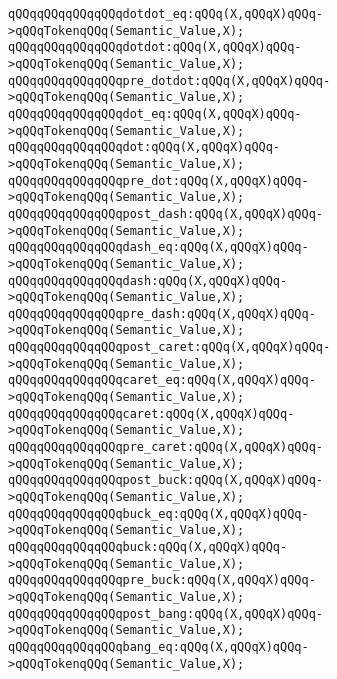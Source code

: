 \verb|qQQqqQQqqQQqqQQqdotdot_eq:qQQq(X,qQQqX)qQQq->qQQqTokenqQQq(Semantic_Value,X);|\newline
\verb|qQQqqQQqqQQqqQQqdotdot:qQQq(X,qQQqX)qQQq->qQQqTokenqQQq(Semantic_Value,X);|\newline
\verb|qQQqqQQqqQQqqQQqpre_dotdot:qQQq(X,qQQqX)qQQq->qQQqTokenqQQq(Semantic_Value,X);|\newline
\verb|qQQqqQQqqQQqqQQqdot_eq:qQQq(X,qQQqX)qQQq->qQQqTokenqQQq(Semantic_Value,X);|\newline
\verb|qQQqqQQqqQQqqQQqdot:qQQq(X,qQQqX)qQQq->qQQqTokenqQQq(Semantic_Value,X);|\newline
\verb|qQQqqQQqqQQqqQQqpre_dot:qQQq(X,qQQqX)qQQq->qQQqTokenqQQq(Semantic_Value,X);|\newline
\verb|qQQqqQQqqQQqqQQqpost_dash:qQQq(X,qQQqX)qQQq->qQQqTokenqQQq(Semantic_Value,X);|\newline
\verb|qQQqqQQqqQQqqQQqdash_eq:qQQq(X,qQQqX)qQQq->qQQqTokenqQQq(Semantic_Value,X);|\newline
\verb|qQQqqQQqqQQqqQQqdash:qQQq(X,qQQqX)qQQq->qQQqTokenqQQq(Semantic_Value,X);|\newline
\verb|qQQqqQQqqQQqqQQqpre_dash:qQQq(X,qQQqX)qQQq->qQQqTokenqQQq(Semantic_Value,X);|\newline
\verb|qQQqqQQqqQQqqQQqpost_caret:qQQq(X,qQQqX)qQQq->qQQqTokenqQQq(Semantic_Value,X);|\newline
\verb|qQQqqQQqqQQqqQQqcaret_eq:qQQq(X,qQQqX)qQQq->qQQqTokenqQQq(Semantic_Value,X);|\newline
\verb|qQQqqQQqqQQqqQQqcaret:qQQq(X,qQQqX)qQQq->qQQqTokenqQQq(Semantic_Value,X);|\newline
\verb|qQQqqQQqqQQqqQQqpre_caret:qQQq(X,qQQqX)qQQq->qQQqTokenqQQq(Semantic_Value,X);|\newline
\verb|qQQqqQQqqQQqqQQqpost_buck:qQQq(X,qQQqX)qQQq->qQQqTokenqQQq(Semantic_Value,X);|\newline
\verb|qQQqqQQqqQQqqQQqbuck_eq:qQQq(X,qQQqX)qQQq->qQQqTokenqQQq(Semantic_Value,X);|\newline
\verb|qQQqqQQqqQQqqQQqbuck:qQQq(X,qQQqX)qQQq->qQQqTokenqQQq(Semantic_Value,X);|\newline
\verb|qQQqqQQqqQQqqQQqpre_buck:qQQq(X,qQQqX)qQQq->qQQqTokenqQQq(Semantic_Value,X);|\newline
\verb|qQQqqQQqqQQqqQQqpost_bang:qQQq(X,qQQqX)qQQq->qQQqTokenqQQq(Semantic_Value,X);|\newline
\verb|qQQqqQQqqQQqqQQqbang_eq:qQQq(X,qQQqX)qQQq->qQQqTokenqQQq(Semantic_Value,X);|\newline
